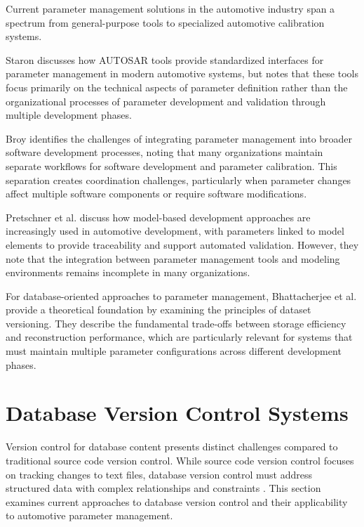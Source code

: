 Current parameter management solutions in the automotive industry span a spectrum from general-purpose tools to specialized automotive calibration systems. 

Staron \cite{staron2021automotive} discusses how AUTOSAR tools provide standardized interfaces for parameter management in modern automotive systems, but notes that these tools focus primarily on the technical aspects of parameter definition rather than the organizational processes of parameter development and validation through multiple development phases.

Broy \cite{broy2006challenges} identifies the challenges of integrating parameter management into broader software development processes, noting that many organizations maintain separate workflows for software development and parameter calibration. This separation creates coordination challenges, particularly when parameter changes affect multiple software components or require software modifications.

Pretschner et al. \cite{pretschner2007software} discuss how model-based development approaches are increasingly used in automotive development, with parameters linked to model elements to provide traceability and support automated validation. However, they note that the integration between parameter management tools and modeling environments remains incomplete in many organizations.

For database-oriented approaches to parameter management, Bhattacherjee et al. \cite{bhattacherjee2015principles} provide a theoretical foundation by examining the principles of dataset versioning. They describe the fundamental trade-offs between storage efficiency and reconstruction performance, which are particularly relevant for systems that must maintain multiple parameter configurations across different development phases.

\section{Database Version Control Systems}
\label{sec:database-version-control}

Version control for database content presents distinct challenges compared to traditional source code version control. While source code version control focuses on tracking changes to text files, database version control must address structured data with complex relationships and constraints \cite{bhattacherjee2015principles}. This section examines current approaches to database version control and their applicability to automotive parameter management.

